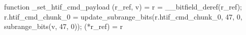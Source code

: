 function _set_htif_cmd_payload (r_ref, v) = {
    r = __bitfield_deref(r_ref);
    r.htif_cmd_chunk_0 = update_subrange_bits(r.htif_cmd_chunk_0, 47, 0, subrange_bits(v, 47, 0));
    (*r_ref) = r
}
